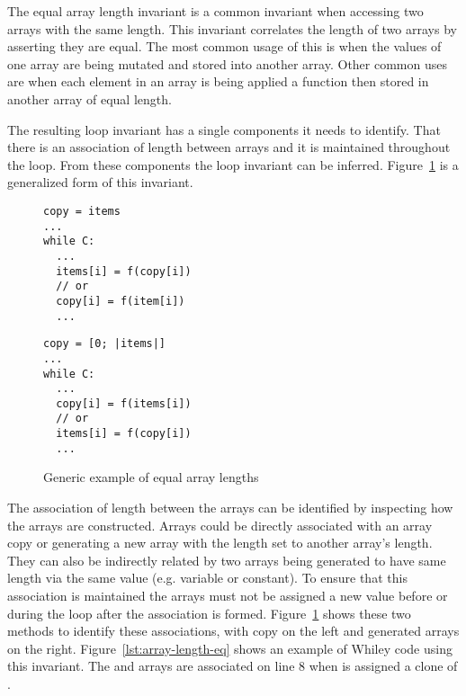 The equal array length invariant is a common invariant when accessing two
arrays with the same length.
This invariant correlates the length of two arrays by asserting they are equal.
The most common usage of this is when the values of one array are being mutated
and stored into another array.
Other common uses are when each element in an array is being applied
a function then stored in another array of equal length.

The resulting loop invariant has a single components it needs to identify.
That there is an association of length between arrays and it is maintained
throughout the loop.
From these components the loop invariant can be inferred.
Figure~\ref{lst:equal-array-length-gen} is a generalized form
of this invariant.


\begin{figure}[ht]
\noindent
\begin{minipage}{.45\textwidth}
\begin{lstlisting}
copy = items
...
while C:
  ...
  items[i] = f(copy[i])
  // or
  copy[i] = f(item[i])
  ...
\end{lstlisting}
\end{minipage}\hfill
\begin{minipage}{.45\textwidth}
\begin{lstlisting}
copy = [0; |items|]
...
while C:
  ...
  copy[i] = f(items[i])
  // or
  items[i] = f(copy[i])
  ...
\end{lstlisting}
\end{minipage}
\caption{Generic example of equal array lengths}
\label{lst:equal-array-length-gen}
\end{figure}

The association of length between the arrays can be identified by inspecting 
how the arrays are constructed.
Arrays could be directly associated with an array copy or generating
a new array with the length set to another array's length.
They can also be indirectly related by two arrays being generated
to have same length via the same value (e.g. variable or constant).
To ensure that this association is maintained the arrays must not 
be assigned a new value before or during the loop after the association
is formed.
Figure~\ref{lst:equal-array-length-gen} shows these two methods to
identify these associations, with copy on the left and generated 
arrays on the right.
Figure~\ref{lst:array-length-eq} shows an example of 
Whiley code using this invariant.
The  and  arrays are associated on line
8 when  is assigned a clone of . 

